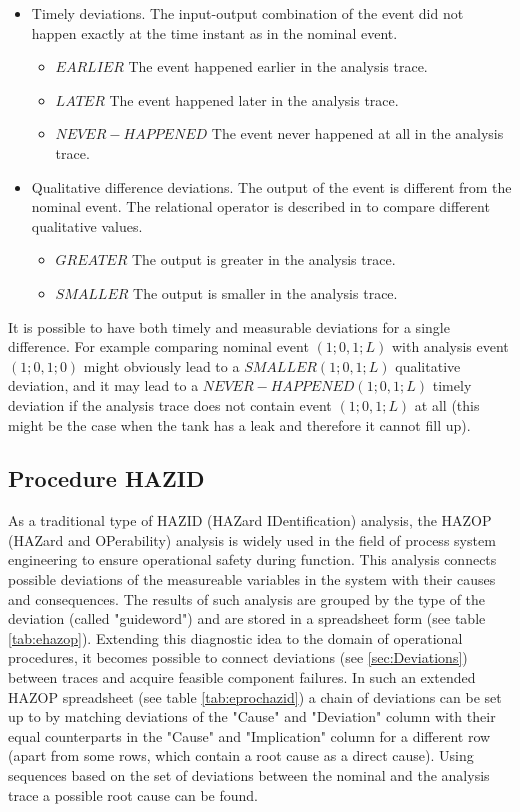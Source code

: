 \documentclass[conference]{IEEEtran}
\begin{document}
\begin{itemize}
\item Timely deviations. The input-output combination of the event did not happen exactly at the time instant as in the nominal event. 
	\begin{itemize}
	  \item $EARLIER$ The event happened earlier in the analysis trace.
	  \item $LATER$ The event happened later in the analysis trace.
	  \item $NEVER-HAPPENED$ The event never happened at all in the analysis trace.
	\end{itemize}
\item Qualitative difference deviations. The output of the event is different from the nominal event. The relational operator is described in \cite{QUALCAL} to compare different qualitative values.
	\begin{itemize}
	  \item $GREATER$ The output is greater in the analysis trace.
	  \item $SMALLER$ The output is smaller in the analysis trace.
	\end{itemize}
\end{itemize}

It is possible to have both timely and measurable deviations for a single difference. For example comparing nominal event $(1;0,1;L)$ with analysis event $(1;0,1;0)$ might obviously lead to a $SMALLER(1;0,1;L)$ qualitative deviation, and it may lead to a $NEVER-HAPPENED(1;0,1;L)$ timely deviation if the analysis trace does not contain event $(1;0,1;L)$ at all (this might be the case when the tank has a leak and therefore it cannot fill up).

\subsection{Procedure HAZID}
\label{sec:prochazid}

As a traditional type of HAZID (HAZard IDentification) analysis, the HAZOP (HAZard and OPerability) analysis is widely used in the field of process system engineering to ensure operational safety during function. This analysis connects possible deviations of the measureable variables in the system with their causes and consequences. The results of such analysis are grouped by the type of the deviation (called "guideword") and are stored in a spreadsheet form (see table \ref{tab:ehazop}). Extending this diagnostic idea to the domain of operational procedures, it becomes possible to connect deviations (see \ref{sec:Deviations}) between traces and acquire feasible component failures. In such an extended HAZOP spreadsheet (see table \ref{tab:eprochazid}) a chain of deviations can be set up to by matching deviations of the "Cause" and "Deviation" column with their equal counterparts in the "Cause" and "Implication" column for a different row (apart from some rows, which contain a root cause as a direct cause). Using sequences based on the set of deviations between the nominal and the analysis trace a possible root cause can be found. 
\end{document}
